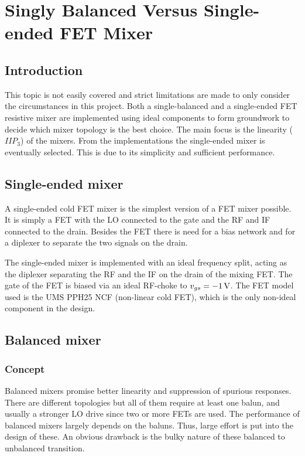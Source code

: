 \chapter{Singly Balanced Versus Single-ended FET Mixer}\label{sec:endvsbal}
	\section{Introduction}
		This topic is not easily covered and strict limitations are made to only consider the circumstances in this project. Both a single-balanced and a single-ended FET resistive mixer are implemented using ideal components to form groundwork to decide which mixer topology is the best choice. The main focus is the linearity ($IIP_3$) of the mixers. From the implementations the single-ended mixer is eventually selected. This is due to its simplicity and sufficient performance.
		
	\section{Single-ended mixer}
		A single-ended cold FET mixer is the simplest version of a FET mixer possible. It is simply a FET with the LO connected to the gate and the RF and IF connected to the drain. Besides the FET there is need for a bias network and for a diplexer to separate the two signals on the drain.
		
		The single-ended mixer is implemented with an ideal frequency split, acting as the diplexer separating the RF and the IF on the drain of the mixing FET. The gate of the FET is biased via an ideal RF-choke to $v_{gs}=\unit[-1]{V}$. The FET model used is the UMS PPH25 NCF (non-linear cold FET), which is the only non-ideal component in the design.
			
	\section{Balanced mixer}
		\subsection{Concept}
			Balanced mixers promise better linearity and suppression of spurious responses. There are different topologies but all of them require at least one balun, and usually a stronger LO drive since two or more FETs are used. The performance of balanced mixers largely depends on the baluns. Thus, large effort is put into the design of these. An obvious drawback is the bulky nature of these balanced to unbalanced transition.
			
